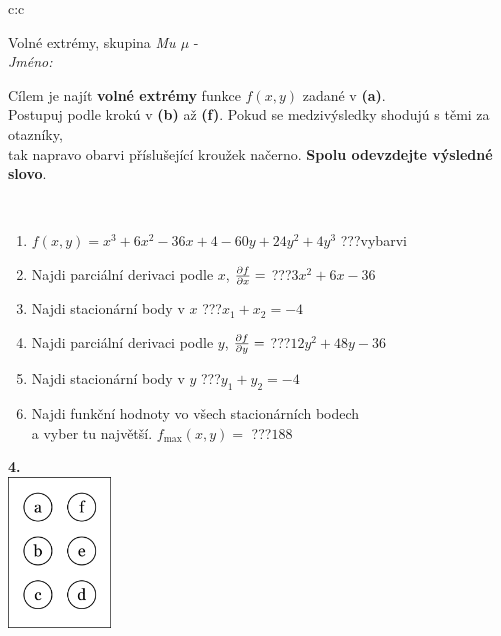 \documentclass[10pt]{report}
\begin{document}
\begin{tabular}{c:c}
\begin{minipage}[c][104.5mm][t]{0.5\linewidth}
\begin{center}
\vspace{7mm}
{\huge Volné extrémy, skupina \textit{Mu $\mu$} -}\\[5mm]
\textit{Jméno:}\phantom{xxxxxxxxxxxxxxxxxxxxxxxxxxxxxxxxxxxxxxxxxxxxxxxxxxxxxxxxxxxxxxxxx}\\[5mm]
\begin{minipage}{0.95\linewidth}
\begin{center}
Cílem je najít \textbf{volné extrémy} funkce $f(x,y)$ zadané v \textbf{(a)}.\\Postupuj podle krokú v \textbf{(b)} až \textbf{(f)}. Pokud se medzivýsledky shodujú s těmi za otazníky,\\tak napravo obarvi příslušející kroužek načerno. \textbf{Spolu odevzdejte výsledné slovo}.
\end{center}
\end{minipage}
\\[1mm]
\begin{minipage}{0.79\linewidth}
\begin{center}
\begin{varwidth}{\linewidth}
\begin{enumerate}
\normalsize
\item $f(x,y)=x^3+6x^2-36x+4-60y+24y^2+4y^3$\quad \dotfill\; ???\;\dotfill \quad vybarvi
\item Najdi parciální derivaci podle $x$, $\pdv{f}{x}=$\quad \dotfill\; ???\;\dotfill \quad $3x^2+6x-36$
\item Najdi stacionární body v $x$\quad \dotfill\; ???\;\dotfill \quad $x_1+x_2=-4$
\item Najdi parciální derivaci podle $y$, $\pdv{f}{y}=$\quad \dotfill\; ???\;\dotfill \quad $12y^2+48y-36$
\item Najdi stacionární body v $y$\quad \dotfill\; ???\;\dotfill \quad $y_1+y_2=-4$
\item Najdi funkční hodnoty vo všech stacionárních bodech \\ \phantom{xxxxxx} a vyber tu najvětší. $f_{\text{max}}(x,y)=$\quad \dotfill\; ???\;\dotfill \quad $188$
\end{enumerate}
\end{varwidth}
\end{center}
\end{minipage}
\begin{minipage}{0.20\linewidth}
\begin{center}
{\Huge\bfseries 4.} \\[2mm]
\includegraphics[height=40mm]{../images/braille.png}

\end{center}
\end{minipage}
\end{center}
\end{minipage}
\end{tabular}
\end{document}
